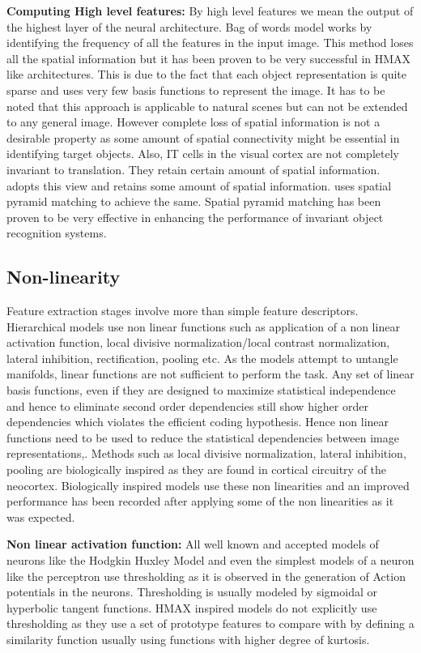 \documentclass[12pt,twoside]{article}
\theoremstyle{plain}
\theoremstyle{definition}
\theoremstyle{remark}
\begin{document}
\textbf{Computing High level features: }
By high level features we mean the output of the highest layer of the neural architecture. Bag of words model works by identifying the frequency of all the features in the input image. This method loses all the spatial information but it has been proven to be very successful in HMAX like architectures. This is due to the fact that each object representation is quite sparse and uses very few basis functions to represent the image. It has to be noted that this approach is applicable to natural scenes but can not be extended to any general image. However complete loss of spatial information is not a desirable property as some amount of spatial connectivity might be essential in identifying target objects. Also, IT cells in the visual cortex are not completely invariant to translation. They retain certain amount of spatial information. \cite{JimMutch2008} adopts this view and retains some amount of spatial information. \cite{XiaolinHu2014} uses spatial pyramid matching to achieve the same. Spatial pyramid matching has been proven to be very effective in enhancing the performance of invariant object recognition systems.
\subsection{Non-linearity}
\label{Subsec: Nonlinear} Feature extraction stages involve more than simple feature descriptors. Hierarchical models use non linear functions such as application of a non linear activation function, local divisive normalization/local contrast normalization, lateral inhibition, rectification, pooling etc. As the models attempt to untangle manifolds, linear functions are not sufficient to perform the task. Any set of linear basis functions, even if they are designed to maximize statistical independence and hence to eliminate second order dependencies still show higher order dependencies\cite{EeroP.Simoncelli1999} which violates the efficient coding hypothesis. Hence non linear functions need to be used to reduce the statistical dependencies between image representations\cite{Bethge2006},. Methods such as local divisive normalization, lateral inhibition, pooling are biologically inspired as they are found in cortical circuitry of the neocortex. Biologically inspired models use these non linearities and an improved performance has been recorded after applying some of the non linearities as it was expected.

\textbf{Non linear activation function: }All well known and accepted models of neurons like the Hodgkin Huxley Model\cite{Hodgkin1952} and even the simplest models of a neuron like the perceptron\cite{Rosenblatt1957} use thresholding as it is observed in the generation of Action potentials in the neurons. Thresholding is usually modeled by sigmoidal or hyperbolic tangent functions. HMAX inspired models do not explicitly use thresholding as they use a set of prototype features to compare with by defining a similarity function usually using functions with higher degree of kurtosis.
\end{document}
